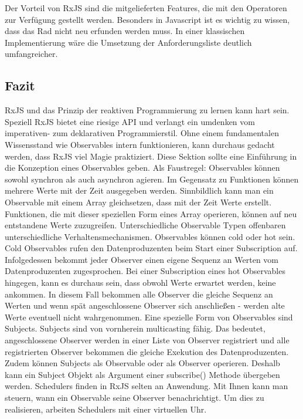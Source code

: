 \noindent
Der Vorteil von RxJS sind die mitgelieferten Features, die mit den Operatoren zur Verfügung gestellt werden. Besonders in Javascript ist es wichtig zu wissen, dass das Rad nicht neu erfunden werden muss. In einer klassischen Implementierung wäre die Umsetzung der Anforderungsliste deutlich umfangreicher. 

\subsection{Fazit}
RxJS und das Prinzip der reaktiven Programmierung zu lernen kann hart sein. Speziell RxJS bietet eine riesige API und verlangt ein umdenken vom imperativen- zum deklarativen Programmierstil. Ohne einem fundamentalen Wissensstand wie Observables intern funktionieren, kann durchaus gedacht werden, dass RxJS viel \glqq Magie\grqq{} praktiziert. Diese Sektion sollte eine Einführung in die Konzeption eines Observables geben. Als Faustregel: Observables können sowohl synchron als auch asynchron agieren. Im Gegensatz zu Funktionen können mehrere Werte mit der Zeit ausgegeben werden. Sinnbildlich kann man ein Observable mit einem Array gleichsetzen, dass mit der Zeit Werte erstellt. Funktionen, die mit dieser speziellen Form eines Array operieren, können auf neu entstandene Werte zuzugreifen. Unterschiedliche Observable Typen offenbaren unterschiedliche Verhaltensmechanismen. Observables können cold oder hot sein. Cold Observables rufen den Datenproduzenten beim Start einer Subscription auf. Infolgedessen bekommt jeder Observer einen eigene Sequenz an Werten vom Datenproduzenten zugesprochen. Bei einer Subscription eines hot Observables hingegen, kann es durchaus sein, dass obwohl Werte erwartet werden, keine ankommen. In diesem Fall bekommen alle Observer die gleiche Sequenz an Werten und wenn spät angeschlossene Observer sich anschließen - werden alte Werte eventuell nicht wahrgenommen. Eine spezielle Form von Observables sind Subjects. Subjects sind von vornherein multicasting fähig. Das bedeutet, angeschlossene Observer werden in einer Liste von Observer registriert und alle registrierten Observer bekommen die gleiche Exekution des Datenproduzenten. Zudem können Subjects als Observable oder als Observer operieren. Deshalb kann ein Subject Objekt als Argument einer subscribe() Methode übergeben werden. Schedulers finden in RxJS selten an Anwendung. Mit Ihnen kann man steuern, wann ein Observable seine Observer benachrichtigt. Um dies zu realisieren, arbeiten Schedulers mit einer virtuellen Uhr.

